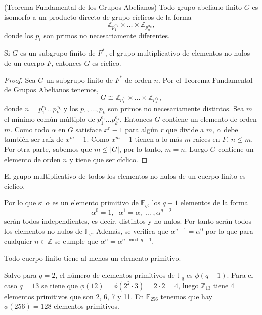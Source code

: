 \begin{teorema}
	(Teorema Fundamental de los Grupos Abelianos) Todo grupo abeliano finito $G$ es isomorfo a un producto directo de grupo cíclicos de la forma
	$$
		\mathbb{Z}_{p^{\alpha_1}_1}\times \dots \times \mathbb{Z}_{p^{\alpha_n}_n},
	$$
	donde los $p_i$ son primos no necesariamente diferentes.
\end{teorema}

\begin{teorema}
		Si $G$ es un subgrupo finito de $F^*$, el grupo multiplicativo de elementos no nulos de un cuerpo $F$, entonces $G$ es cíclico.
\end{teorema}\vspace*{-7mm}
\begin{proof}
		Sea $G$ un subgrupo finito de $F^*$ de orden $n$. Por el Teorema Fundamental de Grupos Abelianos tenemos,
		$$
			G \cong \mathbb{Z}_{p^{e_1}_1}\times \dots \times \mathbb{Z}_{p^{e_k}_k},
		$$
		donde $n = p^{e_1}_1 \dots p^{e_k}_k$ y los $p_1, \dots, p_k$ son primos no necesariamente distintos. Sea $m$ el mínimo común múltiplo de $p^{e_1}_1 \dots p^{e_k}_k$. Entonces $G$ contiene un elemento de orden $m$. Como todo $\alpha$ en $G$ satisface $x^r-1$ para algún $r$ que divide a $m$, $\alpha$ debe también ser raíz de $x^m-1$. Como $x^m-1$ tienen a lo más $m$ raíces en $F$, $n\leq m$. Por otra parte, sabemos que $m\leq |G|$, por lo tanto, $m=n$. Luego $G$ contiene un elemento de orden $n$ y tiene que ser cíclico.\qedhere
\end{proof}

\begin{corolario}
		El grupo multiplicativo de todos los elementos no nulos de un cuerpo finito es cíclico.
\end{corolario}

Por lo que si $\alpha$ es un elemento primitivo de $\mathbb{F}_q$, los $q-1$ elementos de la forma\\
$$
	\alpha^0=1,\;\; \alpha^1=\alpha,\;\dots\; ,\alpha^{q-2}
$$
serán todos independientes, es decir, distintos y no nulos. Por tanto serán todos los elementos no nulos de $\mathbb{F}_q$. Además, se verifica que $\alpha^{q-1}=\alpha^0$ por lo que para cualquier $n \in \mathbb{Z}$ se cumple que $\alpha^n=\alpha^{n\mod q-1}$.\\

\begin{teorema}
	Todo cuerpo finito tiene al menos un elemento primitivo.
\end{teorema}
Salvo para $q=2$, el número de elementos primitivos de $\mathbb{F}_q$ es $\phi(q-1)$. Para el caso $q=13$ se tiene que $\phi(12)=\phi(2^2\cdot 3)=2\cdot2=4$, luego $\mathbb{Z}_{13}$ tiene 4 elementos primitivos que son 2, 6, 7 y 11. En $\mathbb{F}_{256}$ tenemos que hay $\phi(256)=128$ elementos primitivos.

